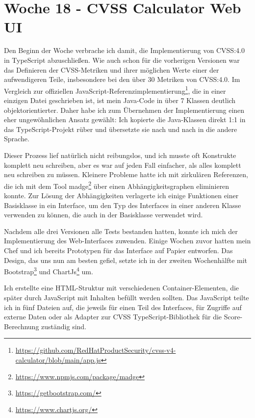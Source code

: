 \section{Woche 18 - CVSS Calculator Web UI} \label{sec:bericht-wo-18}



Den Beginn der Woche verbrache ich damit, die Implementierung von CVSS:4.0 in TypeScript abzuschließen.
Wie auch schon für die vorherigen Versionen war das Definieren der CVSS-Metriken und ihrer möglichen Werte einer der aufwendigeren Teile, insbesondere bei den über 30 Metriken von CVSS:4.0.
Im Vergleich zur offiziellen JavaScript-Referenzimplementierung\footnote{\url{https://github.com/RedHatProductSecurity/cvss-v4-calculator/blob/main/app.js}}, die in einer einzigen Datei geschrieben ist, ist mein Java-Code in über 7 Klassen deutlich objektorientierter.
Daher habe ich zum Übernehmen der Implementierung einen eher ungewöhnlichen Ansatz gewählt:
Ich kopierte die Java-Klassen direkt 1:1 in das TypeScript-Projekt rüber und übersetzte sie nach und nach in die andere Sprache.

Dieser Prozess lief natürlich nicht reibungslos, und ich musste oft Konstrukte komplett neu schreiben, aber es war auf jeden Fall einfacher, als alles komplett neu schreiben zu müssen.
Kleinere Probleme hatte ich mit zirkulären Referenzen, die ich mit dem Tool madge\footnote{\url{https://www.npmjs.com/package/madge}} über einen Abhängigkeitsgraphen eliminieren konnte.
Zur Lösung der Abhängigkeiten verlagerte ich einige Funktionen einer Basisklasse in ein Interface, um den Typ des Interfaces in einer anderen Klasse verwenden zu können, die auch in der Basisklasse verwendet wird.


Nachdem alle drei Versionen alle Tests bestanden hatten, konnte ich mich der Implementierung des Web-Interfaces zuwenden.
Einige Wochen zuvor hatten mein Chef und ich bereits Prototypen für das Interface auf Papier entworfen.
Das Design, das uns nun am besten gefiel, setzte ich in der zweiten Wochenhälfte mit Bootstrap\footnote{\url{https://getbootstrap.com/}} und ChartJs\footnote{\url{https://www.chartjs.org/}} um.

Ich erstellte eine HTML-Struktur mit verschiedenen Container-Elementen, die später durch JavaScript mit Inhalten befüllt werden sollten.
Das JavaScript teilte ich in fünf Dateien auf, die jeweils für einen Teil des Interfaces, für Zugriffe auf externe Daten oder als Adapter zur CVSS TypeScript-Bibliothek für die Score-Berechnung zuständig sind.

